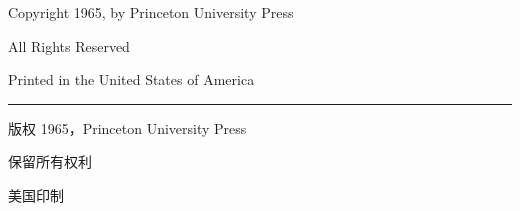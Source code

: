 \thispagestyle{empty}
\vspace*{\fill}

\begin{minipage}{0.82\textwidth}
\raggedright
\small
\setlength{\parindent}{0pt}
\setlength{\parskip}{0.55em}

Copyright \textcopyright{} 1965, by Princeton University Press

All Rights Reserved

Printed in the United States of America

\vspace{1.5em}
\hrule
\vspace{1.5em}

版权 \textcopyright{} 1965，Princeton University Press

保留所有权利

美国印制
\end{minipage}

\vspace*{\fill}
\clearpage
